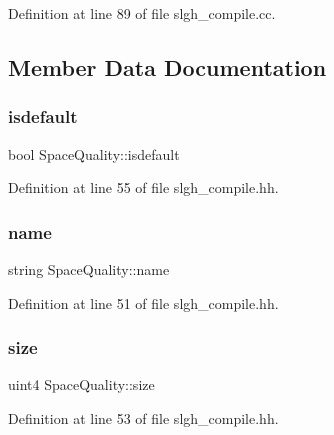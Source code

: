 Definition at line 89 of file slgh\+\_\+compile.\+cc.



\subsection{Member Data Documentation}
\mbox{\label{struct_space_quality_ae2719ff148b6dd3255be4dd09fecb1f0}} 
\subsubsection{\texorpdfstring{isdefault}{isdefault}}
{\footnotesize\ttfamily bool Space\+Quality\+::isdefault}



Definition at line 55 of file slgh\+\_\+compile.\+hh.

\mbox{\label{struct_space_quality_a537fc899e2cd5e0a66bb0cf7d2505734}} 
\subsubsection{\texorpdfstring{name}{name}}
{\footnotesize\ttfamily string Space\+Quality\+::name}



Definition at line 51 of file slgh\+\_\+compile.\+hh.

\mbox{\label{struct_space_quality_a3c569790ce295e87cf41dd8f1393c437}} 
\subsubsection{\texorpdfstring{size}{size}}
{\footnotesize\ttfamily uint4 Space\+Quality\+::size}



Definition at line 53 of file slgh\+\_\+compile.\+hh.

\mbox{\label{struct_space_quality_a224d683b54fb55255b659856b569984f}} 
